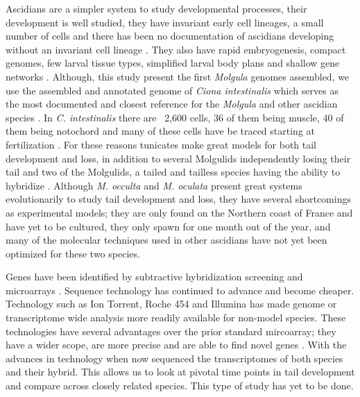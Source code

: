 Ascidians are a simpler system to study developmental processes, their development is well studied, they have invariant early cell lineages, a small number of cells \cite{lemaire_evolutionary_2011} and there has been no documentation of ascidians developing without an invariant cell lineage \cite{lemaire_ascidians_2008}. They also have rapid embryogenesis, compact genomes, few larval tissue types, simplified larval body plans and shallow gene networks \cite{corbo_characterization_1997,jeffery_minireview_2002,dehal_draft_2002}. Although, this study present the first \textit{Molgula} genomes assembled, we use the assembled and annotated genome of \textit{Ciona intestinalis} which serves as the most documented and closest reference for the \textit{Molgula} and other ascidian species \cite{dehal_draft_2002,satoh_ascidian_2003,satoh_ciona_2003}. In \textit{C. intestinalis} there are ~2,600 cells, 36 of them being muscle, 40 of them being notochord and many of these cells have be traced starting at fertilization \cite{nishida_cell_1983}. For these reasons tunicates make great models for both tail development and loss, in addition to several Molgulids independently losing their tail and two of the Molgulids, a tailed and tailless species having the ability to hybridize \cite{jeffery_evolutionary_1991}. Although \textit{M. occulta} and \textit{M. oculata} present great systems evolutionarily to study tail development and loss, they have several shortcomings as experimental models; they are only found on the Northern coast of France and have yet to be cultured, they only spawn for one month out of the year, and many of the molecular techniques used in other ascidians have not yet been optimized for these two species.

Genes have been identified by subtractive hybridization screening and microarrays \cite{jeffery_factors_1992,hotta_characterization_2000,gyoja_analysis_2007,kobayashi_differential_2013}. Sequence technology has continued to advance and become cheaper. Technology such as Ion Torrent, Roche 454 and Illumina has made genome or transcriptome wide analysis more readily available for non-model species. These technologies have several advantages over the prior standard mircoarray; they have a wider scope, are more precise and are able to find novel genes \cite{marioni_rna-seq:_2008}. With the advances in technology when now sequenced the transcriptomes of both species and their hybrid. This allows us to look at pivotal time points in tail development and compare across closely related species. This type of study has yet to be done. 

